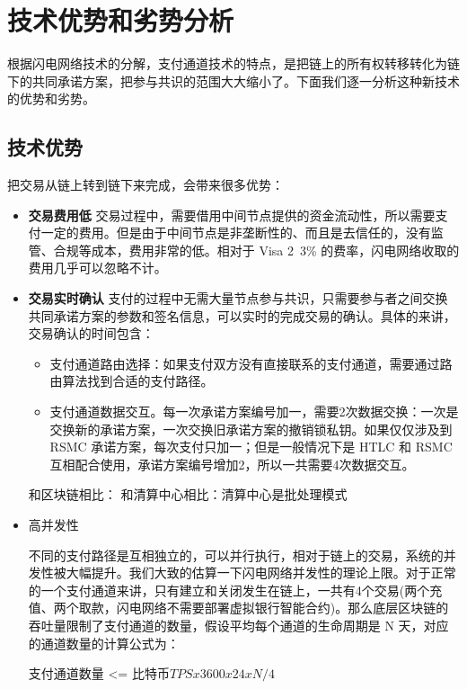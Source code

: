 \section{技术优势和劣势分析}
根据闪电网络技术的分解，支付通道技术的特点，是把链上的所有权转移转化为链下的共同承诺方案，把参与共识的范围大大缩小了。下面我们逐一分析这种新技术的优势和劣势。

\subsection{技术优势}
把交易从链上转到链下来完成，会带来很多优势：

\begin{itemize}
    \item  \textbf{交易费用低}
        交易过程中，需要借用中间节点提供的资金流动性，所以需要支付一定的费用。但是由于中间节点是非垄断性的、而且是去信任的，没有监管、合规等成本，费用非常的低。相对于 Visa 2~3\% 的费率，闪电网络收取的费用几乎可以忽略不计。
        
    \item \textbf{交易实时确认}
        支付的过程中无需大量节点参与共识，只需要参与者之间交换共同承诺方案的参数和签名信息，可以实时的完成交易的确认。具体的来讲，交易确认的时间包含：
        \begin{itemize}
            \item 支付通道路由选择：如果支付双方没有直接联系的支付通道，需要通过路由算法找到合适的支付路径。
            \item 支付通道数据交互。每一次承诺方案编号加一，需要2次数据交换：一次是交换新的承诺方案，一次交换旧承诺方案的撤销锁私钥。如果仅仅涉及到 RSMC 承诺方案，每次支付只加一；但是一般情况下是 HTLC 和 RSMC 互相配合使用，承诺方案编号增加2，所以一共需要4次数据交互。
            
        \end{itemize}
        
        和区块链相比：
        和清算中心相比：清算中心是批处理模式

      \item 高并发性

        不同的支付路径是互相独立的，可以并行执行，相对于链上的交易，系统的并发性被大幅提升。我们大致的估算一下闪电网络并发性的理论上限。对于正常的一个支付通道来讲，只有建立和关闭发生在链上，一共有4个交易(两个充值、两个取款，闪电网络不需要部署虚拟银行智能合约)。那么底层区块链的吞吐量限制了支付通道的数量，假设平均每个通道的生命周期是 N 天，对应的通道数量的计算公式为：

            支付通道数量 <= 比特币$TPS x 3600 x 24 x N / 4$
        

\end{itemize}
